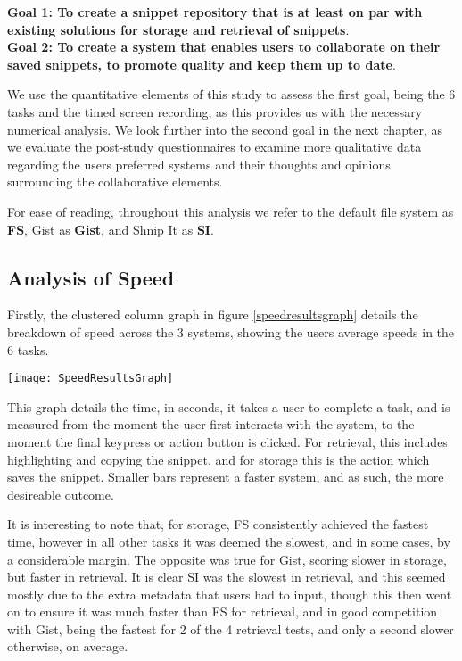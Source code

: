 \textbf{Goal 1: To create a snippet repository that is at least on par with existing solutions for storage and retrieval of snippets}. \\
\textbf{Goal 2: To create a system that enables users to collaborate on their saved snippets, to promote quality and keep them up to date}.

We use the quantitative elements of this study to assess the first goal, being the 6 tasks and the timed screen recording, as this provides us with the necessary numerical analysis.
We look further into the second goal in the next chapter, as we evaluate the post-study questionnaires to examine more qualitative data regarding the users preferred systems and their thoughts and opinions surrounding the collaborative elements.

For ease of reading, throughout this analysis we refer to the default file system as \textbf{FS}, Gist as \textbf{Gist}, and Shnip It as \textbf{SI}.

\subsection{Analysis of Speed}
Firstly, the clustered column graph in figure \ref{speedresultsgraph} details the breakdown of speed across the 3 systems, showing the users average speeds in the 6 tasks.

\begin{sidewaysfigure}[htbp]
\centering
\texttt{[image: SpeedResultsGraph]}
\caption{Time taken in seconds per task performed, for each of the 3 systems \label{speedresultsgraph}}
\end{sidewaysfigure}

This graph details the time, in seconds, it takes a user to complete a task, and is measured from the moment the user first interacts with the system, to the moment the final keypress or action button is clicked. 
For retrieval, this includes highlighting and copying the snippet, and for storage this is the action which saves the snippet.
Smaller bars represent a faster system, and as such, the more desireable outcome.

It is interesting to note that, for storage, FS consistently achieved the fastest time, however in all other tasks it was deemed the slowest, and in some cases, by a considerable margin. 
The opposite was true for Gist, scoring slower in storage, but faster in retrieval.
It is clear SI was the slowest in retrieval, and this seemed mostly due to the extra metadata that users had to input, though this then went on to ensure it was much faster than FS for retrieval, and in good competition with Gist, being the fastest for 2 of the 4 retrieval tests, and only a second slower otherwise, on average.

